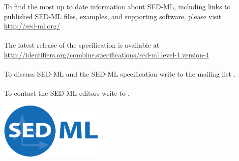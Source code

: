 \begin{titlepage}
\begin{center}
\vspace{1.2in}

\normalsize
\begin{minipage}{5in}
\begin{center}
  To find the most up to date information about SED-ML, including links to published SED-ML files, examples, and supporting software, please visit
  \url{http://sed-ml.org/}

  \paragraph*{}
  The latest release of the \currentLV specification is available at
  \url{http://identifiers.org/combine.specifications/sed-ml.level-1.version-4}

  \paragraph*{}
  To discuss SED-ML and the SED-ML specification write to the mailing list .

  \paragraph*{}
  To contact the SED-ML editors write to .
\end{center}
\end{minipage}
\vfill


\centerline{\includegraphics[width=2in]{images/logoSedml.png}}

\end{center}

\end{titlepage}

%
%

\setcounter{page}{2}



